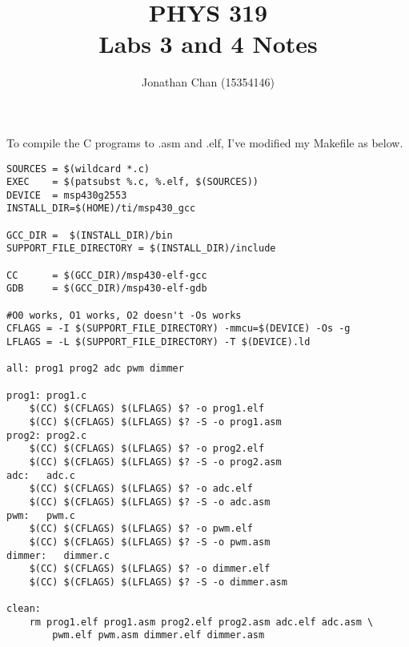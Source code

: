 \documentclass[letterpaper]{article}
\author{Jonathan Chan (15354146)}
\title{PHYS 319\\Labs 3 and 4 Notes}
\begin{document}
	\maketitle
	
	To compile the C programs to .asm and .elf, I've modified my Makefile as below.
	\begin{verbatim}
SOURCES = $(wildcard *.c)
EXEC    = $(patsubst %.c, %.elf, $(SOURCES))
DEVICE  = msp430g2553
INSTALL_DIR=$(HOME)/ti/msp430_gcc

GCC_DIR =  $(INSTALL_DIR)/bin
SUPPORT_FILE_DIRECTORY = $(INSTALL_DIR)/include

CC      = $(GCC_DIR)/msp430-elf-gcc
GDB     = $(GCC_DIR)/msp430-elf-gdb

#O0 works, O1 works, O2 doesn't -Os works
CFLAGS = -I $(SUPPORT_FILE_DIRECTORY) -mmcu=$(DEVICE) -Os -g
LFLAGS = -L $(SUPPORT_FILE_DIRECTORY) -T $(DEVICE).ld

all: prog1 prog2 adc pwm dimmer

prog1: prog1.c
    $(CC) $(CFLAGS) $(LFLAGS) $? -o prog1.elf
    $(CC) $(CFLAGS) $(LFLAGS) $? -S -o prog1.asm
prog2: prog2.c
    $(CC) $(CFLAGS) $(LFLAGS) $? -o prog2.elf
    $(CC) $(CFLAGS) $(LFLAGS) $? -S -o prog2.asm
adc:   adc.c
    $(CC) $(CFLAGS) $(LFLAGS) $? -o adc.elf
    $(CC) $(CFLAGS) $(LFLAGS) $? -S -o adc.asm
pwm:   pwm.c
    $(CC) $(CFLAGS) $(LFLAGS) $? -o pwm.elf
    $(CC) $(CFLAGS) $(LFLAGS) $? -S -o pwm.asm
dimmer:   dimmer.c
    $(CC) $(CFLAGS) $(LFLAGS) $? -o dimmer.elf
    $(CC) $(CFLAGS) $(LFLAGS) $? -S -o dimmer.asm

clean:
	rm prog1.elf prog1.asm prog2.elf prog2.asm adc.elf adc.asm \
		pwm.elf pwm.asm dimmer.elf dimmer.asm
	\end{verbatim}
	
\end{document}
